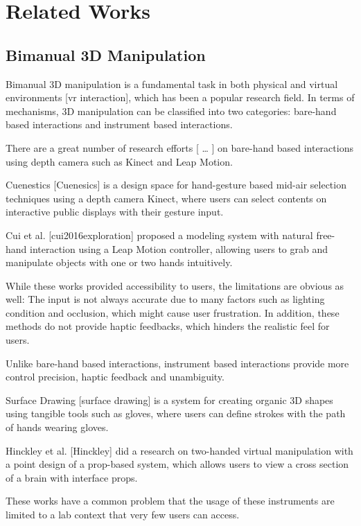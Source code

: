 \section{Related Works}
\label{sec:1}

\subsection{Bimanual 3D Manipulation}
\label{sec:2}

Bimanual 3D manipulation is a fundamental task in both physical and virtual environments [vr interaction], which has been a popular research field. In terms of mechanisms, 3D manipulation can be classified into two categories: bare-hand based interactions and instrument based interactions.

There are a great number of research efforts [ … ] on bare-hand based interactions using depth camera such as Kinect and Leap Motion.

Cuenestics [Cuenesics] is a design space for hand-gesture based mid-air selection techniques using a depth camera Kinect, where users can select contents on interactive public displays with their gesture input.

Cui et al. [cui2016exploration] proposed a modeling system with natural free-hand interaction using a Leap Motion controller, allowing users to grab and manipulate objects with one or two hands intuitively.

While these works provided accessibility to users, the limitations are obvious as well: The input is not always accurate due to many factors such as lighting condition and occlusion, which might cause user frustration. In addition, these methods do not provide haptic feedbacks, which hinders the realistic feel for users.

Unlike bare-hand based interactions, instrument based interactions provide more control precision, haptic feedback and unambiguity.

Surface Drawing [surface drawing] is a system for creating organic 3D shapes using tangible tools such as gloves, where users can define strokes with the path of hands wearing gloves.

Hinckley et al. [Hinckley] did a research on two-handed virtual manipulation with a point design of a prop-based system, which allows users to view a cross section of a brain with interface props.

These works have a common problem that the usage of these instruments are limited to a lab context that very few users can access.

